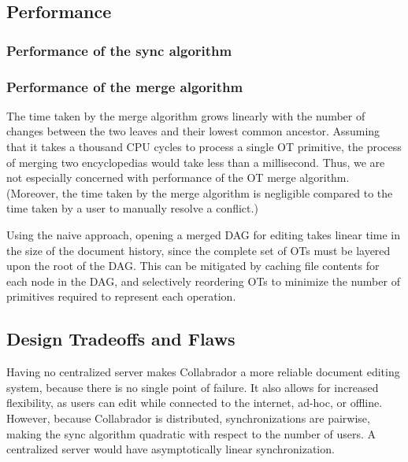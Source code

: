 \documentclass[11pt,titlepage]{article}
\begin{document}
\subsection{Performance}

\subsubsection{Performance of the sync algorithm}


\subsubsection{Performance of the merge algorithm}

The time taken by the merge algorithm grows linearly with the number
of changes between the two leaves and their lowest common ancestor.
Assuming that it takes a thousand CPU cycles to process a single OT
primitive, the process of merging two encyclopedias would take less
than a millisecond.  Thus, we are not especially concerned with
performance of the OT merge algorithm.  (Moreover, the time taken by
the merge algorithm is negligible compared to the time taken by a user
to manually resolve a conflict.)

Using the naive approach, opening a merged DAG for editing takes
linear time in the size of the document history, since the complete
set of OTs must be layered upon the root of the DAG.  This can be
mitigated by caching file contents for each node in the DAG, and
selectively reordering OTs to minimize the number of primitives
required to represent each operation.

\subsection{Design Tradeoffs and Flaws}

Having no centralized server makes Collabrador a more reliable
document editing system, because there is no single point of
failure. It also allows for increased flexibility, as users can edit
while connected to the internet, ad-hoc, or offline. However, because
Collabrador is distributed, synchronizations are pairwise, making the
sync algorithm quadratic with respect to the number of users. A
centralized server would have asymptotically linear synchronization.
\end{document}
